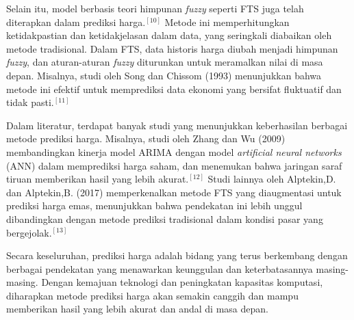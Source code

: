 \documentclass[conference]{IEEEtran}
\begin{document}
Selain itu, model berbasis teori himpunan \textit{fuzzy} seperti FTS juga telah diterapkan dalam prediksi harga.$^{[10]}$ Metode ini memperhitungkan ketidakpastian dan ketidakjelasan dalam data, yang seringkali diabaikan oleh metode tradisional. Dalam FTS, data historis harga diubah menjadi himpunan \textit{fuzzy}, dan aturan-aturan \textit{fuzzy} diturunkan untuk meramalkan nilai di masa depan. Misalnya, studi oleh Song dan Chissom (1993) menunjukkan bahwa metode ini efektif untuk memprediksi data ekonomi yang bersifat fluktuatif dan tidak pasti.$^{[11]}$

Dalam literatur, terdapat banyak studi yang menunjukkan keberhasilan berbagai metode prediksi harga. Misalnya, studi oleh Zhang dan Wu (2009) membandingkan kinerja model ARIMA dengan model \textit{artificial neural networks} (ANN) dalam memprediksi harga saham, dan menemukan bahwa jaringan saraf tiruan memberikan hasil yang lebih akurat.$^{[12]}$ Studi lainnya oleh Alptekin,D. dan Alptekin,B. (2017) memperkenalkan metode FTS yang diaugmentasi untuk prediksi harga emas, menunjukkan bahwa pendekatan ini lebih unggul dibandingkan dengan metode prediksi tradisional dalam kondisi pasar yang bergejolak.$^{[13]}$

Secara keseluruhan, prediksi harga adalah bidang yang terus berkembang dengan berbagai pendekatan yang menawarkan keunggulan dan keterbatasannya masing-masing. Dengan kemajuan teknologi dan peningkatan kapasitas komputasi, diharapkan metode prediksi harga akan semakin canggih dan mampu memberikan hasil yang lebih akurat dan andal di masa depan.


\end{document}
